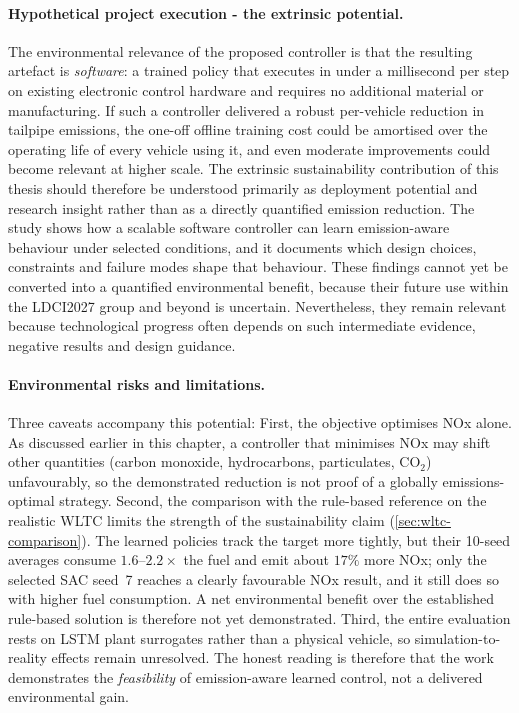 \paragraph{Hypothetical project execution - the extrinsic potential.} The environmental relevance of the proposed controller is that the resulting artefact is \emph{software}: a trained policy that executes in under a millisecond per step on existing electronic control hardware and requires no additional material or manufacturing. If such a controller delivered a robust per-vehicle reduction in tailpipe emissions, the one-off offline training cost could be amortised over the operating life of every vehicle using it, and even moderate improvements could become relevant at higher scale. The extrinsic sustainability contribution of this thesis should therefore be understood primarily as deployment potential and research insight rather than as a directly quantified emission reduction. The study shows how a scalable software controller can learn emission-aware behaviour under selected conditions, and it documents which design choices, constraints and failure modes shape that behaviour. These findings cannot yet be converted into a quantified environmental benefit, because their future use within the \ac{LDCI2027} group and beyond is uncertain. Nevertheless, they remain relevant because technological progress often depends on such intermediate evidence, negative results and design guidance.

\paragraph{Environmental risks and limitations.} Three caveats accompany this potential: First, the objective optimises \ac{NOx} alone. As discussed earlier in this chapter, a controller that minimises \ac{NOx} may shift other quantities (carbon monoxide, hydrocarbons, particulates, $\mathrm{CO}_2$) unfavourably, so the demonstrated reduction is not proof of a globally emissions-optimal strategy. Second, the comparison with the rule-based reference on the realistic \ac{WLTC} limits the strength of the sustainability claim (\autoref{sec:wltc-comparison}). The learned policies track the target more tightly, but their 10-seed averages consume $1.6$--$2.2\times$ the fuel and emit about $17\%$ more \ac{NOx}; only the selected SAC seed~7 reaches a clearly favourable \ac{NOx} result, and it still does so with higher fuel consumption. A net environmental benefit over the established rule-based solution is therefore not yet demonstrated. Third, the entire evaluation rests on \ac{LSTM} plant surrogates rather than a physical vehicle, so simulation-to-reality effects remain unresolved. The honest reading is therefore that the work demonstrates the \emph{feasibility} of emission-aware learned control, not a delivered environmental gain.

